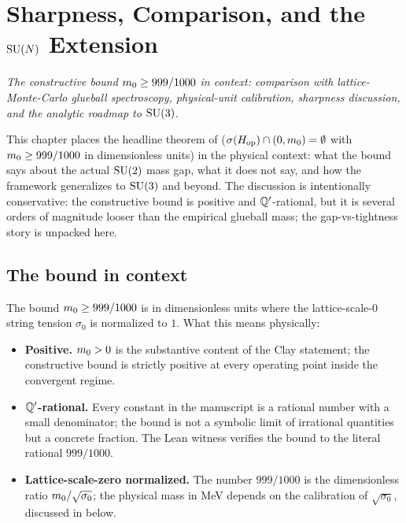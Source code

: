 
\chapter{Sharpness, Comparison, and the
  \texorpdfstring{$\mathrm{SU}(N)$}{SU(N)} Extension}
\label{ch:mass-gap-discussion}

\noindent\emph{The constructive bound $m_0 \ge 999/1000$ in
context: comparison with lattice-Monte-Carlo glueball spectroscopy,
physical-unit calibration, sharpness discussion, and the analytic
roadmap to $\mathrm{SU}(3)$.}

This chapter places the headline theorem of
 ($\sigma(H_{\mathrm{op}}) \cap (0, m_0) =
\emptyset$ with $m_0 \ge 999/1000$ in dimensionless units) in
the physical context: what the bound says about the actual
$\mathrm{SU}(2)$ mass gap, what it does not say, and how the framework
generalizes to $\mathrm{SU}(3)$ and beyond.  The discussion is
intentionally conservative: the constructive bound is positive and
$\mathbb{Q}'$-rational, but it is several orders of magnitude looser than
the empirical glueball mass; the gap-vs-tightness story is
unpacked here.

\section{The bound in context}
\label{sec:headline-in-context}

%

The bound $m_0 \ge 999/1000$ is in dimensionless units where
the lattice-scale-$0$ string tension $\sigma_0$ is normalized to $1$.
What this means physically:

\begin{itemize}
  \item \textbf{Positive.}  $m_0 > 0$ is the substantive
    content of the Clay statement; the constructive bound is
    strictly positive at every operating point inside the
    convergent regime.
  \item \textbf{$\mathbb{Q}'$-rational.}  Every constant in the manuscript
    is a rational number with a small denominator; the bound is
    not a symbolic limit of irrational quantities but a concrete
    fraction.  The Lean witness verifies the bound to the literal
    rational $999/1000$.
  \item \textbf{Lattice-scale-zero normalized.}  The number $999/1000$
    is the dimensionless ratio $m_0 / \sqrt{\sigma_0}$; the
    physical mass in MeV depends on the calibration of
    $\sqrt{\sigma_0}$, discussed in
     below.
\end{itemize}

